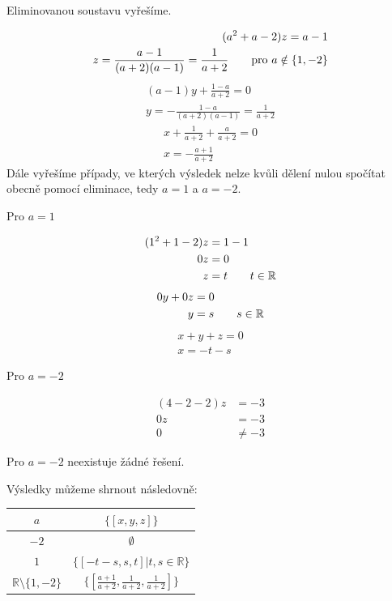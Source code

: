 \documentclass[12pt,a4paper]{article}
\begin{document}
Eliminovanou soustavu vyřešíme.

\begin{align*}
    (a^2 + a - 2)z = a - 1 \\
    z = \frac{a-1}{(a+2)(a-1)} = \frac{1}{a+2} \tag*{pro $a \notin  \{1, -2\}$}\\
\end{align*}
\begin{align*}
    (a-1)y + \frac{1-a}{a+2} = 0\\
    y = -\frac{1-a}{(a+2)(a-1)} = \frac{1}{a+2} \tag*{pro $a \neq -2$}
\end{align*}
\begin{align*}
    x + \frac{1}{a+2} + \frac{a}{a+2} = 0\\
    x = -\frac{a+1}{a+2}
\end{align*}
\newpage
Dále vyřešíme případy, ve kterých výsledek nelze kvůli dělení nulou spočítat obecně pomocí eliminace, tedy $a = 1$ a $a = -2$.

Pro $a = 1$

\begin{align*}
    (1^{2} + 1 - 2)z &= 1 - 1\\
    0z &= 0 \\
    z &= t \tag*{$t \in \mathbb{R}$}
\end{align*}
\begin{align*}
    0y + 0z &= 0 \\
    y &= s \tag*{$s \in \mathbb{R}$}
\end{align*}
\begin{align*}
    x + y + z = 0\\
    x = -t -s
\end{align*}

Pro $a = -2$

\begin{align*}
    (4 - 2 -2)z &= -3\\
    0z &= -3 \\
    0 &\neq -3
\end{align*}

Pro $a = -2$ neexistuje žádné řešení.

Výsledky můžeme shrnout následovně:
\begin{center}
    \begin{tabular}{c|c}
        $a$ & $\{[x, y, z]\}$\\
        \hline
        $-2$ & $\emptyset$ \\
        $1$ & $\{[-t -s, s, t]| t, s \in \mathbb{R}\}$\\
        $\mathbb{R} \setminus \{1, -2\}$ & $\{[\frac{a+1}{a+2}, \frac{1}{a+2}, \frac{1}{a+2}]\}$
    \end{tabular}
\end{center}
\end{document}
